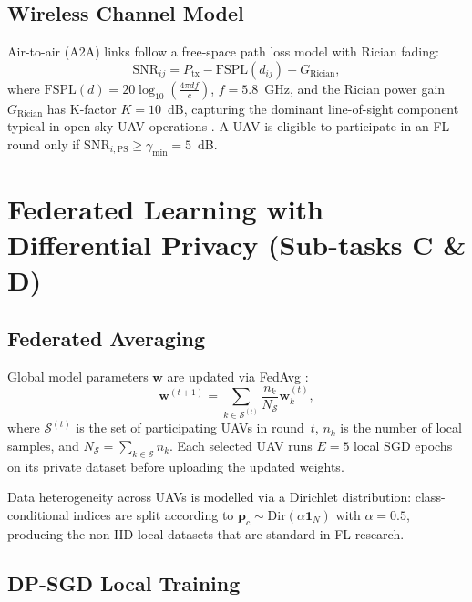 \documentclass[12pt,a4paper]{article}
\begin{document}
\subsection{Wireless Channel Model}

Air-to-air (A2A) links follow a free-space path loss model with Rician fading:
\begin{equation}
  \mathrm{SNR}_{ij} = P_{\text{tx}} - \mathrm{FSPL}(d_{ij}) + G_{\text{Rician}},
  \label{eq:snr}
\end{equation}
where $\mathrm{FSPL}(d) = 20\log_{10}\!\left(\tfrac{4\pi d f}{c}\right)$,
$f = 5.8$~GHz, and the Rician power gain $G_{\text{Rician}}$ has K-factor
$K = 10$~dB, capturing the dominant line-of-sight component typical in open-sky
UAV operations \cite{alhourani2014}.  A UAV is eligible to participate in an FL
round only if $\mathrm{SNR}_{i,\text{PS}} \geq \gamma_{\min} = 5$~dB.

\section{Federated Learning with Differential Privacy (Sub-tasks C \& D)}

\subsection{Federated Averaging}

Global model parameters $\mathbf{w}$ are updated via FedAvg \cite{mcmahan2017}:
\begin{equation}
  \mathbf{w}^{(t+1)} = \sum_{k \in \mathcal{S}^{(t)}} \frac{n_k}{N_{\mathcal{S}}}
  \mathbf{w}_k^{(t)},
  \label{eq:fedavg}
\end{equation}
where $\mathcal{S}^{(t)}$ is the set of participating UAVs in round~$t$,
$n_k$ is the number of local samples, and $N_{\mathcal{S}} = \sum_{k\in\mathcal{S}} n_k$.
Each selected UAV runs $E = 5$ local SGD epochs on its private dataset before
uploading the updated weights.

Data heterogeneity across UAVs is modelled via a Dirichlet distribution:
class-conditional indices are split according to
$\mathbf{p}_c \sim \mathrm{Dir}(\alpha \mathbf{1}_N)$ with $\alpha = 0.5$,
producing the non-IID local datasets that are standard in FL research.

\subsection{DP-SGD Local Training}
\end{document}
